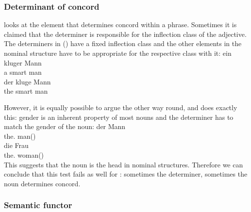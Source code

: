 \documentclass[output=paper
  ,nobabel
  ,draftmode
  ,uniformtopskip %
  ,colorlinks, citecolor=brown
]{langscibook}
\begin{document}
\subsubsection{Determinant of concord}

\citet[Section~2.2.2]{Zwicky85a} looks at the element that determines concord within a
phrase. Sometimes it is claimed that the determiner is responsible for the inflection class of the
adjective. The determiners in () have a fixed inflection class and the other elements in the
nominal structure have to be appropriate for the respective class with it:
\eal
\ex 
\gll ein kluger Mann\\
     a   smart  man\\
\ex
\gll der kluge  Mann\\
     the smart  man\\
\zl

However, it is equally possible to argue the other way round, and \citet[]{Zwicky85a} does exactly
this: gender is an inherent property of most nouns and the determiner has to match the gender of the noun:
\eal
\ex 
\gll der Mann\\
     the.\M{} man(\M)\\
\ex 
\gll die Frau\\
     the.\F{} woman(\F)\\
\zl
This suggests that the noun is the head in nominal structures. Therefore we can conclude that this test
fails as well for : sometimes the determiner, sometimes the noun determines concord.



\subsubsection{Semantic functor}
\end{document}
